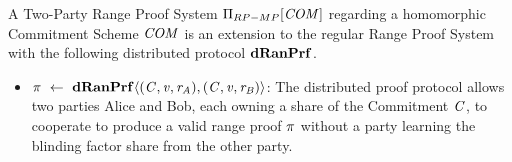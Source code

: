 \begin{definition}\label{def:pre:mp-rangeproof}
    A Two-Party Range Proof System $\Pi_{RP-MP}[\mathit{COM}]$ regarding a homomorphic Commitment Scheme $\mathit{COM}$ is an extension to the regular Range Proof System with the following
    distributed protocol $\mathbf{dRanPrf}$.
    \begin{itemize}
        \item $\pi ~\leftarrow~ \mathbf{dRanPrf} \langle(\mathit{C},\mathit{v},\mathit{r}_{\mathit{A}}),(\mathit{C},\mathit{v},\mathit{r}_{\mathit{B}})\rangle$: The distributed proof protocol allows two parties Alice and Bob, each owning a share of the
        Commitment $\mathit{C}$, to cooperate to produce a valid range proof $\pi$ without a party learning the blinding factor share from the other party.
    \end{itemize}
\end{definition}